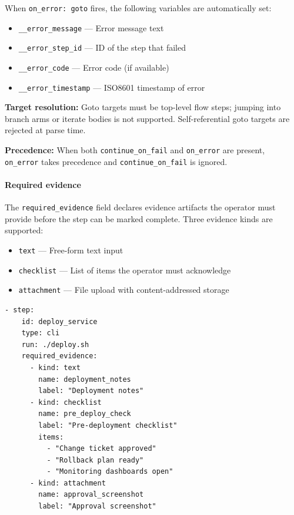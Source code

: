 When \texttt{on\_error: goto} fires, the following variables are automatically set:

\begin{itemize}
  \item \texttt{\_\_error\_message} — Error message text
  \item \texttt{\_\_error\_step\_id} — ID of the step that failed
  \item \texttt{\_\_error\_code} — Error code (if available)
  \item \texttt{\_\_error\_timestamp} — ISO8601 timestamp of error
\end{itemize}

\textbf{Target resolution:} Goto targets must be top-level flow steps; jumping into
branch arms or iterate bodies is not supported.  Self-referential goto targets are
rejected at parse time.

\textbf{Precedence:} When both \texttt{continue\_on\_fail} and \texttt{on\_error} are
present, \texttt{on\_error} takes precedence and \texttt{continue\_on\_fail} is ignored.

\paragraph{Required evidence}
\label{subsec:required-evidence}

The \texttt{required\_evidence} field declares evidence artifacts the operator must
provide before the step can be marked complete.  Three evidence kinds are supported:

\begin{itemize}
  \item \texttt{text} — Free-form text input
  \item \texttt{checklist} — List of items the operator must acknowledge
  \item \texttt{attachment} — File upload with content-addressed storage
\end{itemize}

\begin{verbatim}
- step:
    id: deploy_service
    type: cli
    run: ./deploy.sh
    required_evidence:
      - kind: text
        name: deployment_notes
        label: "Deployment notes"
      - kind: checklist
        name: pre_deploy_check
        label: "Pre-deployment checklist"
        items:
          - "Change ticket approved"
          - "Rollback plan ready"
          - "Monitoring dashboards open"
      - kind: attachment
        name: approval_screenshot
        label: "Approval screenshot"
\end{verbatim}

